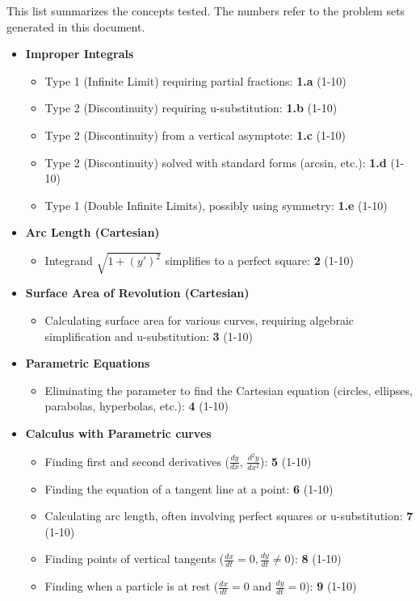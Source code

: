 \documentclass[12pt]{article}
\begin{document}
This list summarizes the concepts tested. The numbers refer to the problem sets generated in this document.

\begin{itemize}
    \item \textbf{Improper Integrals}
    \begin{itemize}
        \item Type 1 (Infinite Limit) requiring partial fractions: \textbf{1.a} (1-10)
        \item Type 2 (Discontinuity) requiring u-substitution: \textbf{1.b} (1-10)
        \item Type 2 (Discontinuity) from a vertical asymptote: \textbf{1.c} (1-10)
        \item Type 2 (Discontinuity) solved with standard forms (arcsin, etc.): \textbf{1.d} (1-10)
        \item Type 1 (Double Infinite Limits), possibly using symmetry: \textbf{1.e} (1-10)
    \end{itemize}
    \item \textbf{Arc Length (Cartesian)}
    \begin{itemize}
        \item Integrand $\sqrt{1+(y')^2}$ simplifies to a perfect square: \textbf{2} (1-10)
    \end{itemize}
    \item \textbf{Surface Area of Revolution (Cartesian)}
    \begin{itemize}
        \item Calculating surface area for various curves, requiring algebraic simplification and u-substitution: \textbf{3} (1-10)
    \end{itemize}
    \item \textbf{Parametric Equations}
    \begin{itemize}
        \item Eliminating the parameter to find the Cartesian equation (circles, ellipses, parabolas, hyperbolas, etc.): \textbf{4} (1-10)
    \end{itemize}
    \item \textbf{Calculus with Parametric curves}
    \begin{itemize}
        \item Finding first and second derivatives ($\frac{dy}{dx}$, $\frac{d^2y}{dx^2}$): \textbf{5} (1-10)
        \item Finding the equation of a tangent line at a point: \textbf{6} (1-10)
        \item Calculating arc length, often involving perfect squares or u-substitution: \textbf{7} (1-10)
        \item Finding points of vertical tangents ($\frac{dx}{dt}=0, \frac{dy}{dt} \ne 0$): \textbf{8} (1-10)
        \item Finding when a particle is at rest ($\frac{dx}{dt}=0$ and $\frac{dy}{dt}=0$): \textbf{9} (1-10)
    \end{itemize}
\end{itemize}
\end{document}
